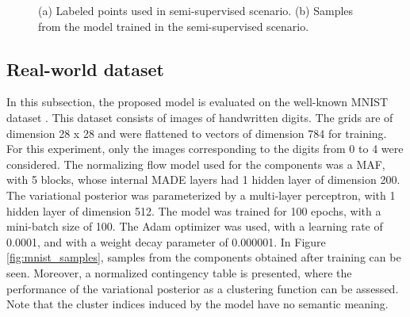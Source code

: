 \begin{figure}[!htb]
  \begin{subfigmatrix}{2}
  \end{subfigmatrix}
    \caption{(a) Labeled points used in semi-supervised scenario. (b) Samples
    from the model trained in the semi-supervised scenario.}
\label{fig:twocircles-semisup}
\end{figure}

\subsection{Real-world dataset}
In this subsection, the proposed model is evaluated on the well-known MNIST
dataset \autocite{MNIST}. This dataset consists of images of handwritten digits.
The grids are of dimension 28 x 28 and were flattened to vectors of dimension 784
for training. For this experiment, only the images corresponding to the digits
from 0 to 4 were considered. The normalizing flow model used for the components
was a MAF, with 5 blocks, whose internal MADE layers had 1 hidden layer of dimension
200. The variational posterior was parameterized by a multi-layer perceptron, with
1 hidden layer of dimension 512. The model was trained for 100 epochs, with a mini-batch
size of 100. The Adam optimizer was used, with a learning rate of 0.0001, and with
a weight decay parameter of 0.000001. In Figure \ref{fig:mnist_samples}, samples
from the components obtained after training can be seen. Moreover, a normalized
contingency table is presented, where the performance of the variational posterior
as a clustering function can be assessed. Note that the cluster indices induced
by the model have no semantic meaning.

